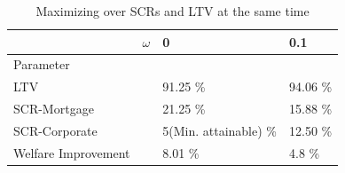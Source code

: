 \documentclass[12pt]{article}
\numberwithin{equation}{section}
\begin{document}
\begin{table}[h]

\caption{Maximizing over SCRs and LTV at the same time}
\label{optimalPrud_2}
\begin{tabular}{l|l|l|l}

 & $\omega$ & 0 & 0.1   \\
 \hline
 \hline
Parameter & & &  \\
\hline
\hline
LTV &  & 91.25 \%   &  94.06 \%  \\

SCR-Mortgage &  & 21.25 \%     & 15.88 \%   \\

SCR-Corporate & &  5(Min. attainable) \%  & 12.50 \%  \\

Welfare Improvement & & 8.01 \% & 4.8 \% \\

\end{tabular}
\end{table}
\end{document}
